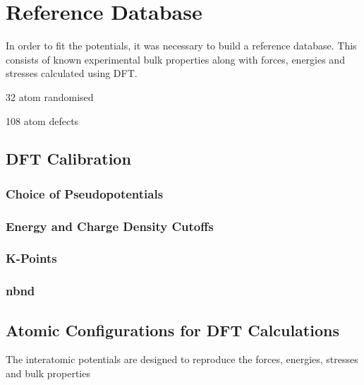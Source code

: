 \section{Reference Database}

In order to fit the potentials, it was necessary to build a reference database.  This consists of known experimental bulk properties along with forces, energies and stresses calculated using DFT.

32 atom randomised

108 atom defects




\subsection{DFT Calibration}

\subsubsection{Choice of Pseudopotentials}






\subsubsection{Energy and Charge Density Cutoffs}




\subsubsection{K-Points}





\subsubsection{nbnd}




\subsection{Atomic Configurations for DFT Calculations}

The interatomic potentials are designed to reproduce the forces, energies, stresses and bulk properties








